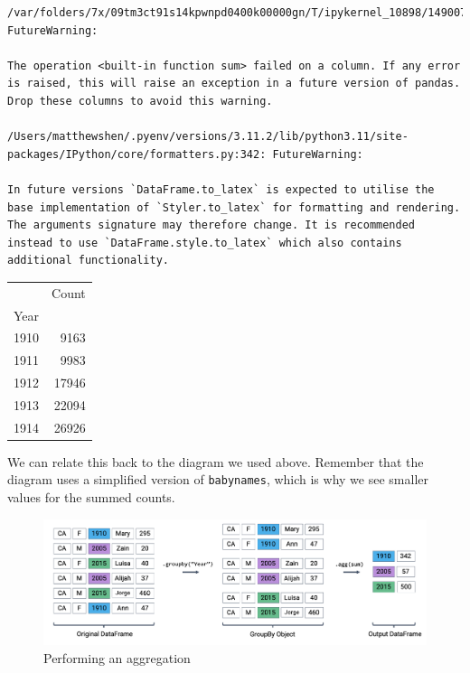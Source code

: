 \documentclass[
  letterpaper,
  DIV=11,
  numbers=noendperiod]{scrreprt}
\begin{document}
\begin{verbatim}
/var/folders/7x/09tm3ct91s14kpwnpd0400k00000gn/T/ipykernel_10898/1490078280.py:1: FutureWarning:

The operation <built-in function sum> failed on a column. If any error is raised, this will raise an exception in a future version of pandas. Drop these columns to avoid this warning.

/Users/matthewshen/.pyenv/versions/3.11.2/lib/python3.11/site-packages/IPython/core/formatters.py:342: FutureWarning:

In future versions `DataFrame.to_latex` is expected to utilise the base implementation of `Styler.to_latex` for formatting and rendering. The arguments signature may therefore change. It is recommended instead to use `DataFrame.style.to_latex` which also contains additional functionality.
\end{verbatim}

\begin{tabular}{lr}
\toprule
{} &  Count \\
Year &        \\
\midrule
1910 &   9163 \\
1911 &   9983 \\
1912 &  17946 \\
1913 &  22094 \\
1914 &  26926 \\
\bottomrule
\end{tabular}

We can relate this back to the diagram we used above. Remember that the
diagram uses a simplified version of \texttt{babynames}, which is why we
see smaller values for the summed counts.

\begin{figure}

{\centering \includegraphics{pandas_2/images/agg.png}

}

\caption{Performing an aggregation}

\end{figure}
\end{document}
